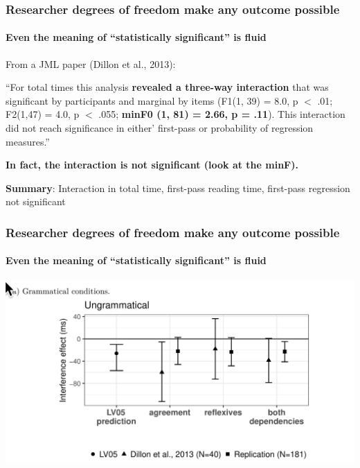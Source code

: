 \documentclass{beamer}
\begin{document}
\begin{frame}[fragile]\frametitle{Researcher degrees of freedom make any outcome possible}
\framesubtitle{Even the meaning of ``statistically significant'' is fluid}

From a JML paper (Dillon et al., 2013):

 ``For total times this analysis \textbf{revealed a three-way interaction} that was significant by participants and marginal by items (F1(1, 39) = 8.0, p $<$ .01; F2(1,47) = 4.0, p $<$ .055; \textbf{minF0 (1, 81) = 2.66, p = .11}). This interaction did not reach significance in either’ first-pass or probability of regression measures.''

\medskip

\textbf{In fact, the interaction is not significant (look at the minF).}

\textbf{Summary}: Interaction in total time, first-pass reading time, first-pass regression not significant
\end{frame}


\begin{frame}[fragile]\frametitle{Researcher degrees of freedom make any outcome possible}
\framesubtitle{Even the meaning of ``statistically significant'' is fluid}

\begin{center}
\includegraphics[scale=0.25]{dillonrepTFT.png}
\end{center}


\end{frame}
\end{document}
